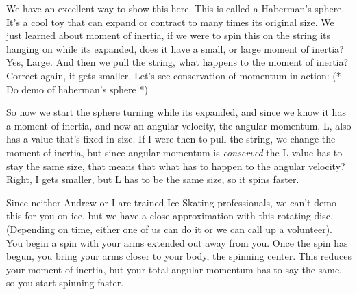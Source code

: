 \documentclass[12pt]{article}
\begin{document}
We have an excellent way to show
this here. This is called a Haberman's sphere. It's a cool toy that can expand or contract
to many times its original size. We just learned about moment of inertia, if we were to spin 
this on the string its hanging on while its expanded, does it have a small, or large moment
of inertia? Yes, Large. And then we pull the string, what happens to the moment of inertia? 
Correct again, it gets smaller. Let's see conservation of momentum in action: 
(* Do demo of haberman's sphere *)

So now we start the sphere turning while its expanded, and since we know it has a moment of 
inertia, and now an angular velocity, the angular momentum, L, also has a value that's 
fixed in size. If I were then to pull the string, we change the moment of inertia, but since 
angular momentum is \emph{conserved} the L value has to stay the same size, that means that
what has to happen to the angular velocity? Right, I gets smaller, but L has to be the same
size, so it spins faster.

Since neither Andrew or I are trained Ice Skating professionals, we can't demo this for you 
on ice, but we have a close approximation with this rotating disc. (Depending on time, 
either one of us can do it or we can call up a volunteer). You begin a spin with your arms
extended out away from you. Once the spin has begun, you bring your arms closer 
to your body, the spinning center. This reduces your moment of inertia, but your total
angular momentum has to say the same, so you start spinning faster. 
\end{document}
